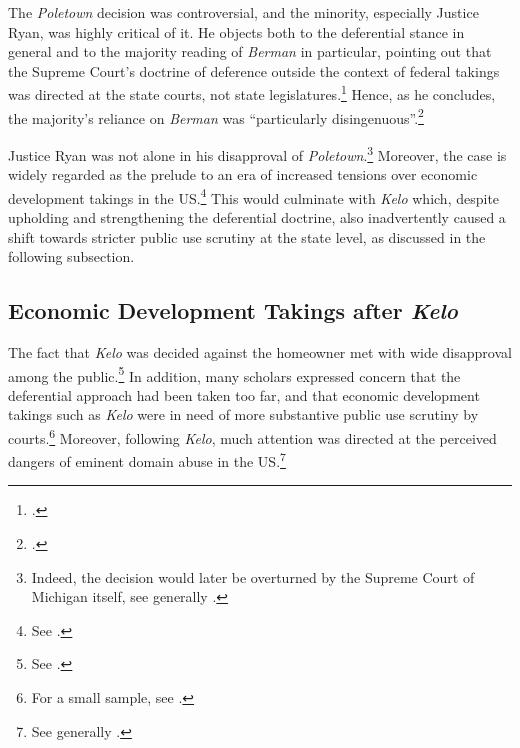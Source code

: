 The {\it Poletown} decision was controversial, and the minority, especially Justice Ryan, was highly critical of it. He objects both to the deferential stance in general and to the majority reading of {\it Berman} in particular, pointing out that the Supreme Court's doctrine of deference outside the context of federal takings was  directed at the state courts, not state legislatures.\footcite[668]{poletown81} Hence, as he concludes, the majority's reliance on {\it Berman} was ``particularly disingenuous''.\footcite[668]{poletown81} 

Justice Ryan was not alone in his disapproval of {\it Poletown}.\footnote{Indeed, the decision would later be overturned by the Supreme Court of Michigan itself, see generally \cite{sandefur05}.} Moreover, the case is widely regarded as the prelude to an era of increased tensions over economic development takings in the US.\footnote{See \cite[664-668]{sandefur05}.} This would culminate with {\it Kelo} which, despite upholding and strengthening the deferential doctrine, also inadvertently caused a shift towards stricter public use scrutiny at the state level, as discussed in the following subsection.

\subsection{Economic Development Takings after {\it Kelo}}\label{sec:postkelo}

The fact that {\it Kelo} was decided against the homeowner met with wide disapproval among the public.\footnote{See \cite[2109]{somin09}.} In addition, many scholars expressed concern that the deferential approach had been taken too far, and that economic development takings such as {\it Kelo} were in need of more substantive public use scrutiny by courts.\footnote{For a small sample, see \cite{cohen06,underkuffler06,sandefur06,somin07,gisler10}.}
Moreover, following {\it Kelo}, much attention was directed at the perceived dangers of eminent domain abuse in the US.\footnote{See generally \cite{somin09}.} %

